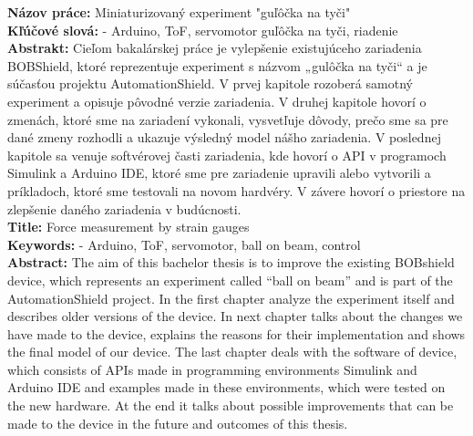 \noindent
\textbf{Názov práce:} Miniaturizovaný experiment "guľôčka na tyči"\\
\textbf{Kľúčové slová: } -	Arduino, ToF, servomotor guľôčka na tyči, riadenie\\
\textbf{Abstrakt: } Cieľom bakalárskej práce je vylepšenie existujúceho zariadenia BOBShield, ktoré reprezentuje experiment s názvom „gulôčka na tyči“ a je súčasťou projektu AutomationShield. V prvej kapitole rozoberá samotný experiment a opisuje pôvodné verzie zariadenia. V druhej kapitole hovorí o zmenách, ktoré sme na zariadení vykonali, vysvetľuje dôvody, prečo sme sa pre dané zmeny rozhodli a ukazuje výsledný model nášho zariadenia. V poslednej kapitole sa venuje softvérovej časti zariadenia, kde hovorí o API v programoch Simulink a Arduino IDE, ktoré sme pre zariadenie upravili alebo vytvorili a príkladoch, ktoré sme testovali na novom hardvéry. V závere hovorí o priestore na zlepšenie daného zariadenia v budúcnosti. \\

\noindent
\textbf{Title:} Force measurement by strain gauges\\
\textbf{Keywords: } -	Arduino, ToF, servomotor, ball on beam, control\\
\textbf{Abstract: }The aim of this bachelor thesis is to improve the existing BOBshield device, which represents an experiment called “ball on beam” and is part of the AutomationShield project. In the first chapter analyze the experiment itself and describes older versions of the device. In next chapter  talks about the changes we have made to the device, explains the reasons for their implementation and shows the final model of our device. The last chapter deals with the software of device, which consists of APIs made in programming environments Simulink and Arduino IDE and examples made in these environments, which were tested on the new hardware. At the end it talks about possible improvements that can be made to the device in the future and outcomes of this thesis.     
\cleardoublepage